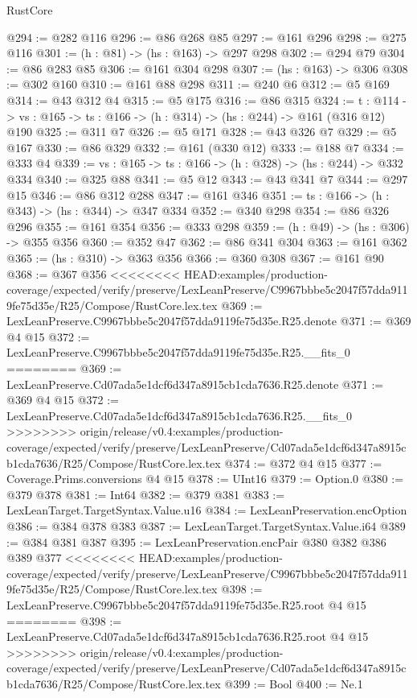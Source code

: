 \begin{lexlean}{RustCore}
\begin{coremodule}
{\begin{coremodule}
@294 := @282 @116
@296 := @86 @268 @85
@297 := @161 @296
@298 := @275 @116
@301 := (h : @81) -> (hs : @163) -> @297 @298
@302 := @294 @79
@304 := @86 @283 @85
@306 := @161 @304 @298
@307 := (hs : @163) -> @306
@308 := @302 @160
@310 := @161 @88 @298
@311 := @240 @6
@312 := @5 @169
@314 := @43 @312 @4
@315 := @5 @175
@316 := @86 @315
@324 := {t : @114} ->
  {vs : @165} -> {ts : @166} -> (h : @314) -> (hs : @244) -> @161 (@316 @12) @190
@325 := @311 @7
@326 := @5 @171
@328 := @43 @326 @7
@329 := @5 @167
@330 := @86 @329
@332 := @161 (@330 @12)
@333 := @188 @7
@334 := @333 @4
@339 := {vs : @165} -> {ts : @166} -> (h : @328) -> (hs : @244) -> @332 @334
@340 := @325 @88
@341 := @5 @12
@343 := @43 @341 @7
@344 := @297 @15
@346 := @86 @312 @288
@347 := @161 @346
@351 := {ts : @166} -> (h : @343) -> (hs : @344) -> @347 @334
@352 := @340 @298
@354 := @86 @326 @296
@355 := @161 @354
@356 := @333 @298
@359 := (h : @49) -> (hs : @306) -> @355 @356
@360 := @352 @47
@362 := @86 @341 @304
@363 := @161 @362
@365 := (hs : @310) -> @363 @356
@366 := @360 @308
@367 := @161 @90
@368 := @367 @356
<<<<<<<< HEAD:examples/production-coverage/expected/verify/preserve/LexLeanPreserve/C9967bbbe5c2047f57dda9119fe75d35e/R25/Compose/RustCore.lex.tex
@369 := LexLeanPreserve.C9967bbbe5c2047f57dda9119fe75d35e.R25.denote
@371 := @369 @4 @15
@372 := LexLeanPreserve.C9967bbbe5c2047f57dda9119fe75d35e.R25.__fits_0
========
@369 := LexLeanPreserve.Cd07ada5e1dcf6d347a8915cb1cda7636.R25.denote
@371 := @369 @4 @15
@372 := LexLeanPreserve.Cd07ada5e1dcf6d347a8915cb1cda7636.R25.__fits_0
>>>>>>>> origin/release/v0.4:examples/production-coverage/expected/verify/preserve/LexLeanPreserve/Cd07ada5e1dcf6d347a8915cb1cda7636/R25/Compose/RustCore.lex.tex
@374 := @372 @4 @15
@377 := Coverage.Prims.conversions @4 @15
@378 := UInt16
@379 := Option.{0}
@380 := @379 @378
@381 := Int64
@382 := @379 @381
@383 := LexLeanTarget.TargetSyntax.Value.u16
@384 := LexLeanPreservation.encOption
@386 := @384 @378 @383
@387 := LexLeanTarget.TargetSyntax.Value.i64
@389 := @384 @381 @387
@395 := LexLeanPreservation.encPair @380 @382 @386 @389 @377
<<<<<<<< HEAD:examples/production-coverage/expected/verify/preserve/LexLeanPreserve/C9967bbbe5c2047f57dda9119fe75d35e/R25/Compose/RustCore.lex.tex
@398 := LexLeanPreserve.C9967bbbe5c2047f57dda9119fe75d35e.R25.root @4 @15
========
@398 := LexLeanPreserve.Cd07ada5e1dcf6d347a8915cb1cda7636.R25.root @4 @15
>>>>>>>> origin/release/v0.4:examples/production-coverage/expected/verify/preserve/LexLeanPreserve/Cd07ada5e1dcf6d347a8915cb1cda7636/R25/Compose/RustCore.lex.tex
@399 := Bool
@400 := Ne.{1}

\end{coremodule}}
\end{coremodule}
\end{lexlean}
